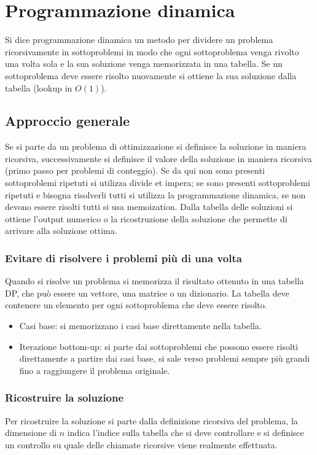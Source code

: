 \chapter{Programmazione dinamica}
Si dice programmazione dinamica un metodo per dividere un problema ricorsivamente in sottoproblemi in modo che ogni sottoproblema venga rivolto una volta sola e la sua soluzione venga memorizzata in
una tabella. Se un sottoproblema deve essere risolto nuovamente si ottiene la sua soluzione dalla tabella (lookup in $O(1)$).
\section{Approccio generale}
Se si parte da un problema di ottimizzazione si definisce la soluzione in maniera ricorsiva, successivamente si definisce il valore della soluzione in maniera ricorsiva (primo passo per problemi di conteggio). Se da
qui non sono presenti sottoproblemi ripetuti si utilizza divide et impera; se sono presenti sottoproblemi ripetuti e bisogna risolverli tutti si utilizza la programmazione dinamica, se non devono essere risolti tutti
si usa memoization. Dalla tabella delle soluzioni si ottiene l'output numerico o la ricostruzione della soluzione che permette di arrivare alla soluzione ottima. 
\subsection{Evitare di risolvere i problemi pi\`u di una volta}
Quando si risolve un problema si memorizza il risultato ottenuto in una tabella DP, che pu\`o essere un vettore, una matrice o un dizionario. La tabella deve contenere un elemento per ogni sottoproblema che
deve essere risolto.
\begin{itemize}
\item Casi base: si memorizzano i casi base direttamente nella tabella.
\item Iterazione bottom-up: si parte dai sottoproblemi che possono essere risolti direttamente a partire dai casi base, si sale verso problemi sempre pi\`u grandi fino a raggiungere il problema originale. 
\end{itemize} 
\subsection{Ricostruire la soluzione}
Per ricostruire la soluzione si parte dalla definizione ricorsiva del problema, la dimensione di $n$ indica l'indice sulla tabella che si deve controllare e si definisce un controllo su quale delle chiamate ricorsive 
viene realmente effettuata.
